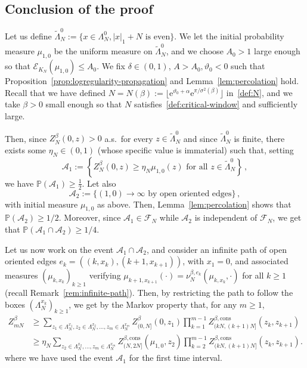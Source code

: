 \documentclass[11pt]{amsart}
\numberwithin{equation}{section}
\newcommand{\e}{\mathrm{e}}
\newcommand*{\cons}{\mathrm{cons}}
\theoremstyle{plain}
\theoremstyle{definition}
\theoremstyle{remark}
\begin{document}
\subsection{Conclusion of the proof}
\label{sec:conclusion}

{Let us define \(\tilde\Lambda_N^0 :=\{ x \in \Lambda_N^0, |x|_1+N \text{ is even}\}\).
We let the initial probability measure \(\mu_{1,0}\) be the uniform measure on \(\tilde\Lambda_N^0\), and we choose \(A_0>1\) large enough so that \(\mathcal{E}_{K_N}(\mu_{1,0})\leq A_0\). We fix \(\delta \in (0,1)\), \(A>A_0,\vartheta_0<0\) such that Proposition~\ref{prop:logregularity-propagation} and Lemma~\ref{lem:percolation} hold.
Recall that we have defined \(N = N(\beta) := \lfloor \e^{\vartheta_0 +\alpha} \e^{\pi/\sigma^2(\beta)}\rfloor\) in~\eqref{def:N}, and we take $\beta>0$ small enough so that \(N\) satisfies~\eqref{def:critical-window} and sufficiently large.}

Then, since $Z_N^{\beta}(0,z)>0$ a.s.\ for every $z\in\tilde\Lambda_{N}^{0}$ and since \(\tilde\Lambda_{N}^{0}\) is finite, there exists some $\eta_N\in(0,1)$ (whose specific value is immaterial) such that, setting
$$
\mathcal A_1:= \left\{Z_N^{\beta}(0,z)\ge \eta_N\mu_{1,0}(z)\text{ for all }
z\in\tilde\Lambda_N^{0}\right\} \,,
$$
we have \(\mathbb P(\mathcal A_1)\ge  \frac12\). Let also 
\[
\mathcal A_2:=\{(1,0)\longrightarrow \infty \text{ by open oriented edges}\} \,,
\]
with initial measure \(\mu_{1,0}\) as above.
Then, Lemma~\ref{lem:percolation} shows that $\mathbb P(\mathcal A_2 )\ge 1/2$. 
Moreover, since $\mathcal A_1 \in \mathcal{F}_N$ while $\mathcal A_2$ is independent of \(\mathcal{F}_N\), we get that $\mathbb P(\mathcal A_1\cap\mathcal A_2)\ge 1/4$.

\smallskip
Let us now work on the event $\mathcal A_1\cap\mathcal A_2$, and consider an infinite path of open oriented edges \(e_k = ((k,x_k),(k+1,x_{k+1}))\), with \(x_1=0\), and associated measures \((\mu_{k,x_k})_{k\geq 1}\) verifying \(\mu_{k+1,x_{k+1}}(\cdot) = \nu_N^{\beta,e_k}(\mu_{k,x_k},\cdot)\) for all \(k\geq 1\) (recall Remark~\ref{rem:infinite-path}).
Then, by restricting the path to follow the boxes \((\Lambda_N^{x_k})_{k\geq 1}\), we get by the Markov property that, for any \(m\geq 1\),
\begin{align*}
 Z_{mN}^{\beta}
&\ge \sum_{z_1\in \Lambda_N^{x_1},z_2\in\Lambda_N^{x_2},\ldots,z_m\in\Lambda_N^{x_m}}
Z_{(0,N]}^{\beta}(0,z_1)
\prod_{k=1}^{m-1} Z_{(kN,(k+1)N]}^{\beta,\cons}(z_k,z_{k+1})\\
&\ge \eta_N
\sum_{z_2\in\Lambda_N^{x_2},\ldots,z_m\in\Lambda_N^{x_m}}
Z_{(N,2N]}^{\beta,\cons}(\mu_{1,0},z_2)
\prod_{k=2}^{m-1} Z_{(kN,(k+1)N]}^{\beta,\cons}(z_k,z_{k+1}).
\end{align*}
where we have used the event \(\mathcal{A}_1\) for the first time interval.
\end{document}
